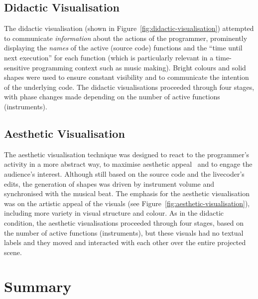 \subsection{Didactic Visualisation}
\label{sec:didactic-visualisation}

The didactic visualisation (shown in Figure~\ref{fig:didactic-visualisation}) attempted to communicate \emph{information} about the actions of the programmer, prominently displaying the \emph{names} of the active (source code) functions and the ``time until next execution'' for each function (which is particularly relevant in a time-sensitive programming context such as music making). Bright colours and solid shapes were used to ensure constant visibility and to communicate the intention of the underlying code. The didactic visualisations proceeded through four stages, with phase changes made depending on the number of active functions (instruments).

\subsection{Aesthetic Visualisation}
\label{sec:aesthetic-visualisation}

The aesthetic visualisation technique was designed to react to the programmer's activity in a more abstract way, to maximise aesthetic appeal~\cite{Cawthon2007} and to engage the audience's interest. Although still based on the source code and the livecoder's edits, the generation of shapes was driven by instrument volume and synchronised with the musical beat. The emphasis for the aesthetic visualisation was on the artistic appeal of the visuals (see Figure~\ref{fig:aesthetic-visualisation}), including more variety in visual structure and colour. As in the didactic condition, the aesthetic visualisations proceeded through four stages, based on the number of active functions (instruments), but these visuals had no textual labels and they moved and interacted with each other over the entire projected scene.






\section{Summary}




